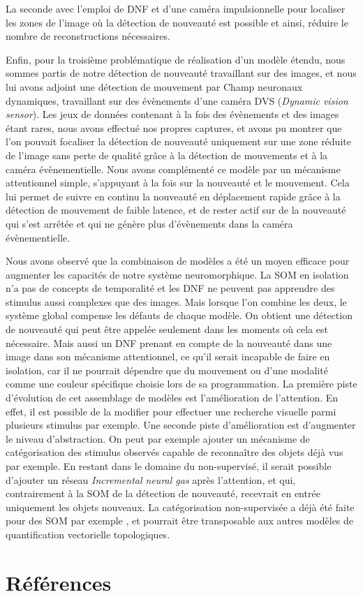 La seconde avec l'emploi de DNF et d'une caméra impulsionnelle pour localiser les zones de l'image où la détection de nouveauté est possible et ainsi, réduire le nombre de reconstructions nécessaires. 

Enfin, pour la troisième problématique de réalisation d'un modèle étendu, nous sommes partis de notre détection de nouveauté travaillant sur des images, et nous lui avons adjoint une détection de mouvement par Champ neuronaux dynamiques, travaillant sur des évènements d'une caméra DVS (\textit{Dynamic vision sensor}). Les jeux de données contenant à la fois des évènements et des images étant rares, nous avons effectué nos propres captures, et avons pu montrer que l'on pouvait focaliser la détection de nouveauté uniquement sur une zone réduite de l'image sans perte de qualité grâce à la détection de mouvements et à la caméra évènementielle. Nous avons complémenté ce modèle par un mécanisme attentionnel simple, s'appuyant à la fois sur la nouveauté et le mouvement. Cela lui permet de suivre en continu la nouveauté en déplacement rapide grâce à la détection de mouvement de faible latence, et de rester actif sur de la nouveauté qui s'est arrêtée et qui ne génère plus d'évènements dans la caméra évènementielle.

Nous avons observé que la combinaison de modèles a été un moyen efficace pour augmenter les capacités de notre système neuromorphique. La SOM en isolation n'a pas de concepts de temporalité et les DNF ne peuvent pas apprendre des stimulus aussi complexes que des images. Mais lorsque l'on combine les deux, le système global compense les défauts de chaque modèle. On obtient une détection de nouveauté qui peut être appelée seulement dans les moments où cela est nécessaire. Mais aussi un DNF prenant en compte de la nouveauté dans une image dans son mécanisme attentionnel, ce qu'il serait incapable de faire en isolation, car il ne pourrait dépendre que du mouvement ou d'une modalité comme une couleur spécifique choisie lors de sa programmation. La première piste d'évolution de cet assemblage de modèles est l'amélioration de l'attention. En effet, il est possible de la modifier pour effectuer une recherche visuelle parmi plusieurs stimulus \cite{fix2011dynamic} par exemple. Une seconde piste d'amélioration est d'augmenter le niveau d'abstraction. On peut par exemple ajouter un mécanisme de catégorisation des stimulus observés capable de reconnaître des objets déjà vus par exemple. En restant dans le domaine du non-supervisé, il serait possible d'ajouter un réseau \textit{Incremental neural gas} après l'attention, et qui, contrairement à la SOM de la détection de nouveauté, recevrait en entrée uniquement les objets nouveaux. La catégorisation non-supervisée a déjà été faite pour des SOM par exemple \cite{khacef2019self}, et pourrait être transposable aux autres modèles de quantification vectorielle topologiques.


\section*{Références}

\renewcommand{\section}[2]{}%
